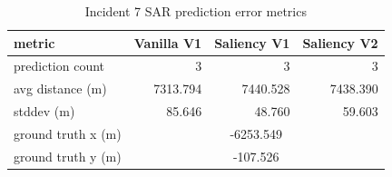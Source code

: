 \begin{table}[ht]
\centering
\caption{Incident 7 SAR prediction error metrics}
\label{tab:sar-incident-7}
\begin{tabular}{lrrr}
\hline
metric & Vanilla V1 & Saliency V1 & Saliency V2 \\
\hline
prediction count & 3 & 3 & 3 \\
avg distance (m) & 7313.794 & 7440.528 & 7438.390 \\
stddev (m) & 85.646 & 48.760 & 59.603 \\
ground truth x (m) & \multicolumn{3}{c}{-6253.549} \\
ground truth y (m) & \multicolumn{3}{c}{-107.526} \\
\hline
\end{tabular}
\end{table}

